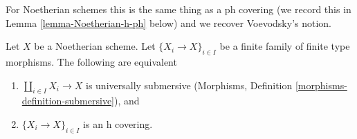 \noindent
For Noetherian schemes this is the same thing as a ph covering
(we record this in Lemma \ref{lemma-Noetherian-h-ph} below) and
we recover Voevodsky's notion.

\begin{lemma}
\label{lemma-Noetherian-h-covering}
Let $X$ be a Noetherian scheme. Let $\{X_i \to X\}_{i \in I}$
be a finite family of finite type morphisms. The following are equivalent
\begin{enumerate}
\item $\coprod_{i \in I} X_i \to X$ is universally submersive
(Morphisms, Definition
\ref{morphisms-definition-submersive}), and
\item $\{X_i \to X\}_{i \in I}$ is an h covering.
\end{enumerate}
\end{lemma}

